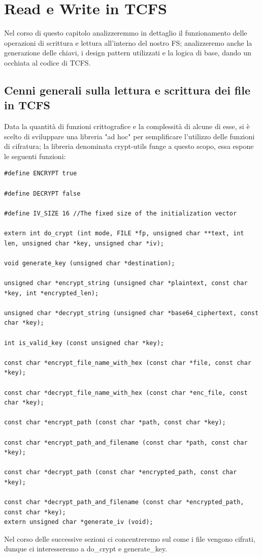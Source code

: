 \chapter{Read e Write in TCFS}
Nel corso di questo capitolo analizzeremmo in dettaglio il funzionamento delle operazioni di scrittura e lettura all'interno del nostro FS; analizzeremo anche la generazione delle chiavi, i design pattern utilizzati e la logica di base, dando un occhiata al codice di TCFS.

\section{Cenni generali sulla lettura e scrittura dei file in TCFS}
Data la quantità di funzioni crittografice e la complessità di alcune di esse, si è scelto di sviluppare una libreria "ad hoc" per semplificare l'utilizzo delle funzioni di cifratura; la libreria denominata crypt-utils funge a questo scopo, essa espone le seguenti funzioni:

\begin{lstlisting}[style=C, caption=Funzioni di crypt-utils, label=C-crypt-utils-functions.h]
#define ENCRYPT true

#define DECRYPT false

#define IV_SIZE 16 //The fixed size of the initialization vector

extern int do_crypt (int mode, FILE *fp, unsigned char **text, int len, unsigned char *key, unsigned char *iv);

void generate_key (unsigned char *destination);

unsigned char *encrypt_string (unsigned char *plaintext, const char *key, int *encrypted_len);

unsigned char *decrypt_string (unsigned char *base64_ciphertext, const char *key);

int is_valid_key (const unsigned char *key);

const char *encrypt_file_name_with_hex (const char *file, const char *key);

const char *decrypt_file_name_with_hex (const char *enc_file, const char *key);

const char *encrypt_path (const char *path, const char *key);

const char *encrypt_path_and_filename (const char *path, const char *key);

const char *decrypt_path (const char *encrypted_path, const char *key);

const char *decrypt_path_and_filename (const char *encrypted_path, const char *key);
extern unsigned char *generate_iv (void);

\end{lstlisting}
Nel corso delle successive sezioni ci concentreremo sul come i file vengono cifrati, dunque ci interesseremo a do\_crypt e generate\_key.

